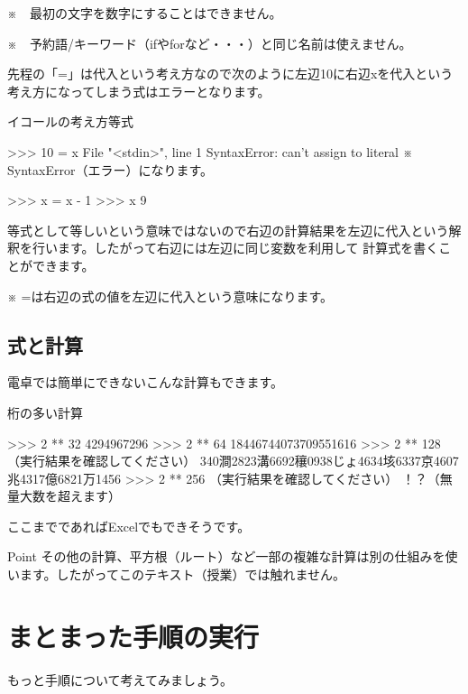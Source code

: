 \documentclass[11pt,a4paper,dvipdfmx,titlepage]{jsreport}
\begin{document}
\begin{description}

\item ※　最初の文字を数字にすることはできません。
\item ※　予約語/キーワード（ifやforなど・・・）と同じ名前は使えません。

\end{description}
 先程の「=」は代入という考え方なので次のように左辺10に右辺xを代入という考え方になってしまう式はエラーとなります。


\begin{grabox}{イコールの考え方等式}
\begin{listingcont}
>>> 10 = x
  File "<stdin>", line 1
SyntaxError: can't assign to literal
 ※ SyntaxError（エラー）になります。

>>> x = x - 1
>>> x
9
\end{listingcont}
\end{grabox}
等式として等しいという意味ではないので右辺の計算結果を左辺に代入という解釈を行います。したがって右辺には左辺に同じ変数を利用して
計算式を書くことができます。

 ※ =は右辺の式の値を左辺に代入という意味になります。

\subsection{式と計算}
 電卓では簡単にできないこんな計算もできます。
\begin{grabox}{桁の多い計算}
\begin{listingcont}
>>> 2 ** 32
4294967296
>>> 2 ** 64
18446744073709551616
>>> 2 ** 128
（実行結果を確認してください）
  340澗2823溝6692穰0938じょ4634垓6337京4607兆4317億6821万1456
>>> 2 ** 256
（実行結果を確認してください）
  ！？（無量大数を超えます）
\end{listingcont}
\end{grabox}

ここまでであればExcelでもできそうです。
\begin{hipoint}{Point}
 その他の計算、平方根（ルート）など一部の複雑な計算は別の仕組みを使います。したがってこのテキスト（授業）では触れません。
\end{hipoint}


\section{まとまった手順の実行}
もっと手順について考えてみましょう。
\end{document}
